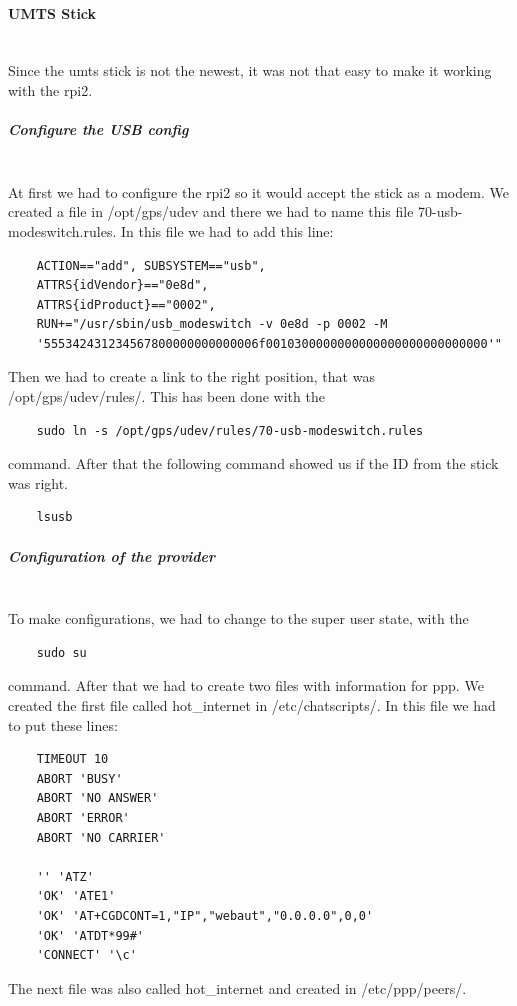 \paragraph{UMTS Stick} \mbox{}\\
Since the \gls{umts} stick is not the newest, it was not that easy to make it working with the \gls{rpi2}.
\subparagraph{Configure the USB config} \mbox{}\\
At first we had to configure the \gls{rpi2} so it would accept the stick as a modem.\newline
We created a file in /opt/gps/udev and there we had to name this file 70-usb-modeswitch.rules. In this file we had to add this line:
\begin{verbatim}
	ACTION=="add", SUBSYSTEM=="usb", 
	ATTRS{idVendor}=="0e8d", 
	ATTRS{idProduct}=="0002", 
	RUN+="/usr/sbin/usb_modeswitch -v 0e8d -p 0002 -M 
	'555342431234567800000000000006f0010300000000000000000000000000'"
\end{verbatim}
Then we had to create a link to the right position, that was /opt/gps/udev/rules/. This has been done with the 
\begin{verbatim}
	sudo ln -s /opt/gps/udev/rules/70-usb-modeswitch.rules
\end{verbatim}
command.\newline
After that the following command showed us if the ID from the stick was right.
\begin{verbatim}
	lsusb
\end{verbatim}
\subparagraph{Configuration of the provider}\mbox{}\\
To make configurations, we had to change to the super user state, with the 
\begin{verbatim}
	sudo su
\end{verbatim}
command.\newline
After that we had to create two files with information for ppp. \newline
We created the first file called hot\_internet in /etc/chatscripts/. \newline
In this file we had to put these lines:
\begin{verbatim}
	TIMEOUT 10
	ABORT 'BUSY'
	ABORT 'NO ANSWER'
	ABORT 'ERROR'
	ABORT 'NO CARRIER'
 
	'' 'ATZ'
	'OK' 'ATE1'
	'OK' 'AT+CGDCONT=1,"IP","webaut","0.0.0.0",0,0'
	'OK' 'ATDT*99#'
	'CONNECT' '\c'
\end{verbatim}
The next file was also called hot\_internet and created in /etc/ppp/peers/.\newline
